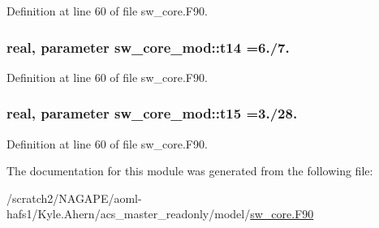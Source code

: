 Definition at line 60 of file sw\-\_\-core.\-F90.

\subsubsection[{t14}]{\setlength{\rightskip}{0pt plus 5cm}real, parameter sw\-\_\-core\-\_\-mod\-::t14 =6./7.}\label{classsw__core__mod_a26fc1c57b4befd2a298ccb59ecc89dec}


Definition at line 60 of file sw\-\_\-core.\-F90.

\subsubsection[{t15}]{\setlength{\rightskip}{0pt plus 5cm}real, parameter sw\-\_\-core\-\_\-mod\-::t15 =3./28.}\label{classsw__core__mod_a70b3a9054c37076798e133275af2143d}


Definition at line 60 of file sw\-\_\-core.\-F90.



The documentation for this module was generated from the following file\-:\begin{DoxyCompactItemize}
\item 
/scratch2/\-N\-A\-G\-A\-P\-E/aoml-\/hafs1/\-Kyle.\-Ahern/acs\-\_\-master\-\_\-readonly/model/\hyperlink{sw__core_8F90}{sw\-\_\-core.\-F90}\end{DoxyCompactItemize}
